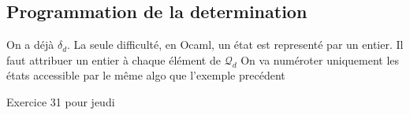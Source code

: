 \subsection{Programmation de la determination}
On a déjà $\delta_d$. La seule difficulté, en Ocaml, un état est representé par un entier. Il faut attribuer un entier à chaque élément de $\mathcal{Q}_d$
On va numéroter uniquement les états accessible par le même algo que l'exemple precédent 

Exercice 31 pour jeudi







